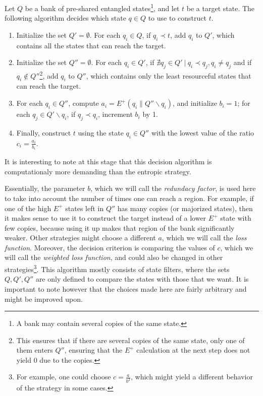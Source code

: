 \begin{definition} \label{strat:uniqueness}
    Let $Q$ be a bank of pre-shared entangled states\footnote{A bank may contain several copies of the same state.}, and let $t$ be a target state. The following algorithm decides which state $q \in Q$ to use to construct $t$.
    \begin{enumerate}
        \item Initialize the set $Q' = \emptyset$. For each $q_i \in Q$, if $q_i \prec t$, add $q_i$ to $Q'$, which contains all the states that can reach the target.
        \item Initialize the set $Q'' = \emptyset$. For each $q_i \in Q'$, if $\nexists q_j \in Q' \: | \: q_i \prec q_j, q_i \neq q_j$ and if $q_i \notin Q''$\footnote{This ensures that if there are several copies of the same state, only one of them enters $Q''$, ensuring that the $E^+$ calculation at the next step does not yield 0 due to the copies.}, add $q_i$ to $Q''$, which contains only the least resourceful states that can reach the target.
        \item For each $q_i \in Q''$, compute $a_i = E^+(q_i \parallel Q'' \backslash q_i)$, and initialize $b_i = 1$; for each $q_j \in Q' \backslash q_i$, if $q_j \prec q_i$, increment $b_i$ by 1. \label{step:volume}
        \item Finally, construct $t$ using the state $q_i \in Q''$ with the lowest value of the ratio $c_i = \frac{a_i}{b_i}$.
    \end{enumerate}
\end{definition}

\noindent It is interesting to note at this stage that this decision algorithm is computationaly more demanding than the entropic strategy.

Essentially, the parameter $b$, which we will call the \textit{redundacy factor}, is used here to take into account the number of times one can reach a region. For example, if one of the high $E^+$ states left in $Q''$ has many copies (or majorized states), then it makes sense to use it to construct the target instead of a lower $E^+$ state with few copies, because using it up makes that region of the bank significantly weaker. Other strategies might choose a different $a$, which we will call the \textit{loss function}. Moreover, the decision criterion is comparing the values of $c$, which we will call the \textit{weighted loss function}, and could also be changed in other strategies\footnote{For example, one could choose $c = \frac{a}{b^2}$, which might yield a different behavior of the strategy in some cases.}.%
This algorithm mostly consists of state filters, where the sets $Q, Q', Q''$ are only defined to compare the states with those that we want. It is important to note however that the choices made here are fairly arbitrary and might be improved upon.

